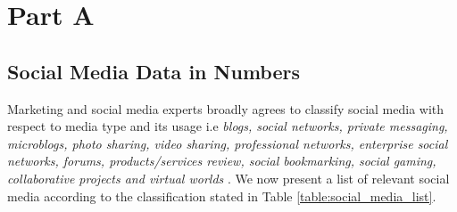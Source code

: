 \section{Part A}
\subsection*{Social Media Data in Numbers}
Marketing and social media experts broadly agrees to classify social media with respect to media type and its usage i.e {\em blogs, social networks, private messaging, microblogs,  photo sharing,  video sharing, professional networks,  enterprise social networks, forums, products/services review, social bookmarking, social gaming, collaborative projects  and virtual worlds} \cite{aichner2015measuring}. We now present a list of relevant social media according to the classification stated in Table \ref{table:social_media_list}.

